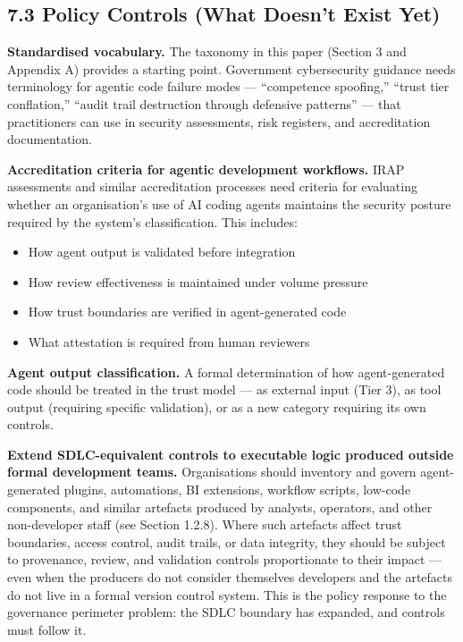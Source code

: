 \documentclass[a4paper,11pt]{report}
\providecommand{\tightlist}{%
  \setlength{\itemsep}{0pt}\setlength{\parskip}{0pt}}
\begin{document}
\hypertarget{policy-controls-what-doesnt-exist-yet}{%
\subsection{7.3 Policy Controls (What Doesn't Exist
Yet)}\label{policy-controls-what-doesnt-exist-yet}}

\textbf{Standardised vocabulary.} The taxonomy in this paper (Section 3
and Appendix A) provides a starting point. Government cybersecurity
guidance needs terminology for agentic code failure modes ---
``competence spoofing,'' ``trust tier conflation,'' ``audit trail
destruction through defensive patterns'' --- that practitioners can use
in security assessments, risk registers, and accreditation
documentation.

\textbf{Accreditation criteria for agentic development workflows.} IRAP
assessments and similar accreditation processes need criteria for
evaluating whether an organisation's use of AI coding agents maintains
the security posture required by the system's classification. This
includes:

\begin{itemize}
\tightlist
\item
  How agent output is validated before integration
\item
  How review effectiveness is maintained under volume pressure
\item
  How trust boundaries are verified in agent-generated code
\item
  What attestation is required from human reviewers
\end{itemize}

\textbf{Agent output classification.} A formal determination of how
agent-generated code should be treated in the trust model --- as
external input (Tier 3), as tool output (requiring specific validation),
or as a new category requiring its own controls.

\textbf{Extend SDLC-equivalent controls to executable logic produced
outside formal development teams.} Organisations should inventory and
govern agent-generated plugins, automations, BI extensions, workflow
scripts, low-code components, and similar artefacts produced by
analysts, operators, and other non-developer staff (see Section 1.2.8).
Where such artefacts affect trust boundaries, access control, audit
trails, or data integrity, they should be subject to provenance, review,
and validation controls proportionate to their impact --- even when the
producers do not consider themselves developers and the artefacts do not
live in a formal version control system. This is the policy response to
the governance perimeter problem: the SDLC boundary has expanded, and
controls must follow it.
\end{document}
